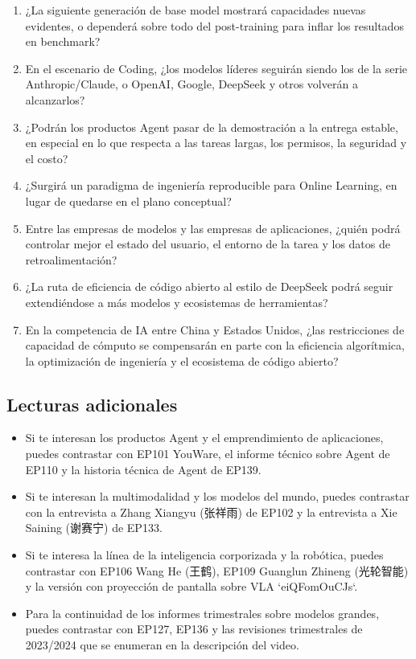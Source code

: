 \begin{enumerate}
\item ¿La siguiente generación de base model mostrará capacidades nuevas evidentes, o dependerá sobre todo del post-training para inflar los resultados en benchmark?
\item En el escenario de Coding, ¿los modelos líderes seguirán siendo los de la serie Anthropic/Claude, o OpenAI, Google, DeepSeek y otros volverán a alcanzarlos?
\item ¿Podrán los productos Agent pasar de la demostración a la entrega estable, en especial en lo que respecta a las tareas largas, los permisos, la seguridad y el costo?
\item ¿Surgirá un paradigma de ingeniería reproducible para Online Learning, en lugar de quedarse en el plano conceptual?
\item Entre las empresas de modelos y las empresas de aplicaciones, ¿quién podrá controlar mejor el estado del usuario, el entorno de la tarea y los datos de retroalimentación?
\item ¿La ruta de eficiencia de código abierto al estilo de DeepSeek podrá seguir extendiéndose a más modelos y ecosistemas de herramientas?
\item En la competencia de IA entre China y Estados Unidos, ¿las restricciones de capacidad de cómputo se compensarán en parte con la eficiencia algorítmica, la optimización de ingeniería y el ecosistema de código abierto?
\end{enumerate}

\subsection{Lecturas adicionales}

\begin{itemize}
\item Si te interesan los productos Agent y el emprendimiento de aplicaciones, puedes contrastar con EP101 YouWare, el informe técnico sobre Agent de EP110 y la historia técnica de Agent de EP139.
\item Si te interesan la multimodalidad y los modelos del mundo, puedes contrastar con la entrevista a Zhang Xiangyu (张祥雨) de EP102 y la entrevista a Xie Saining (谢赛宁) de EP133.
\item Si te interesa la línea de la inteligencia corporizada y la robótica, puedes contrastar con EP106 Wang He (王鹤), EP109 Guanglun Zhineng (光轮智能) y la versión con proyección de pantalla sobre VLA `eiQFomOuCJs`.
\item Para la continuidad de los informes trimestrales sobre modelos grandes, puedes contrastar con EP127, EP136 y las revisiones trimestrales de 2023/2024 que se enumeran en la descripción del video.
\end{itemize}


